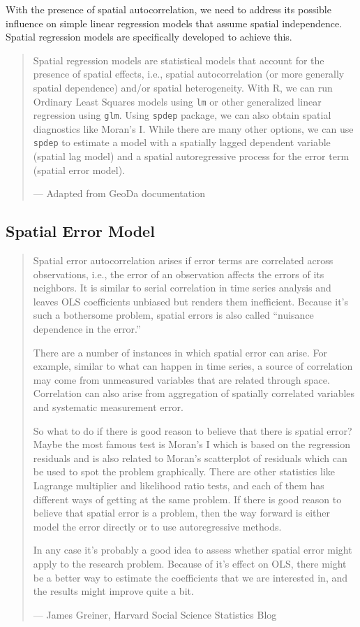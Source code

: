 \documentclass[
  11pt,
]{book}
\begin{document}
With the presence of spatial autocorrelation, we need to address its possible influence on simple linear regression models that assume spatial independence. Spatial regression models are specifically developed to achieve this.

\begin{quote}
Spatial regression models are statistical models that account for the presence of spatial effects, i.e., spatial autocorrelation (or more generally spatial dependence) and/or spatial heterogeneity. With R, we can run Ordinary Least Squares models using \texttt{lm} or other generalized linear regression using \texttt{glm}. Using \texttt{spdep} package, we can also obtain spatial diagnostics like Moran's I. While there are many other options, we can use \texttt{spdep} to estimate a model with a spatially lagged dependent variable (spatial lag model) and a spatial autoregressive process for the error term (spatial error model).

--- Adapted from GeoDa documentation
\end{quote}

\hypertarget{spatial-error-model}{%
\subsection{Spatial Error Model}\label{spatial-error-model}}

\begin{quote}
Spatial error autocorrelation arises if error terms are correlated across observations, i.e., the error of an observation affects the errors of its neighbors. It is similar to serial correlation in time series analysis and leaves OLS coefficients unbiased but renders them inefficient. Because it's such a bothersome problem, spatial errors is also called ``nuisance dependence in the error.''

There are a number of instances in which spatial error can arise. For example, similar to what can happen in time series, a source of correlation may come from unmeasured variables that are related through space. Correlation can also arise from aggregation of spatially correlated variables and systematic measurement error.

So what to do if there is good reason to believe that there is spatial error? Maybe the most famous test is Moran's I which is based on the regression residuals and is also related to Moran's scatterplot of residuals which can be used to spot the problem graphically. There are other statistics like Lagrange multiplier and likelihood ratio tests, and each of them has different ways of getting at the same problem. If there is good reason to believe that spatial error is a problem, then the way forward is either model the error directly or to use autoregressive methods.

In any case it's probably a good idea to assess whether spatial error might apply to the research problem. Because of it's effect on OLS, there might be a better way to estimate the coefficients that we are interested in, and the results might improve quite a bit.

--- James Greiner, Harvard Social Science Statistics Blog
\end{quote}
\end{document}

